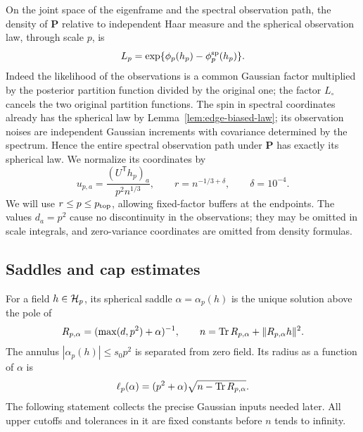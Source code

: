 On the joint space of the eigenframe and the spectral observation path,
the density of $\mathbf P$ relative to independent Haar measure and the
spherical observation law, through scale $p$, is
\begin{equation}\label{eq:source-4}
 L_p=\exp\{\phi_p(h_p)-\phi_p^{\rm sp}(h_p)\}.
\end{equation}
Indeed the likelihood of the observations is a common Gaussian factor
multiplied by the posterior partition function divided by the original one;
the factor $L_\circ$ cancels the two original partition functions.
The spin in spectral coordinates already has the spherical law by
Lemma~\ref{lem:edge-biased-law}; its observation noises are independent
Gaussian increments with covariance determined by the spectrum.  Hence the
entire spectral observation path under $\mathbf P$ has exactly its
spherical law.  We normalize its coordinates by
\[
 u_{p,a}=\frac{(U^{\mathsf T}h_p)_a}{p^2n^{1/3}},
 \qquad r=n^{-1/3+\delta},\qquad \delta=10^{-4}.
\]
We will use $r\le p\le p_{\rm top}$, allowing fixed-factor buffers at the
endpoints.  The values $d_a=p^2$ cause no discontinuity in the observations;
they may be omitted in scale integrals, and zero-variance coordinates are
omitted from density formulas.

\subsection{Saddles and cap estimates}

For a field $h\in\mathcal H_p$, its spherical saddle $\alpha=\alpha_p(h)$ is
the unique solution above the pole of
\begin{equation}\label{eq:source-5}
 R_{p,\alpha}=(\max(d,p^2)+\alpha)^{-1},\qquad
 n=\operatorname{Tr} R_{p,\alpha}+\|R_{p,\alpha}h\|^2.
\end{equation}
The annulus $|\alpha_p(h)|\le s_0p^2$ is separated from zero field.  Its
radius as a function of $\alpha$ is
\[
 \ell_p(\alpha)=(p^2+\alpha)\sqrt{n-\operatorname{Tr} R_{p,\alpha}}.
\]
The following statement collects the precise Gaussian inputs needed later.
All upper cutoffs and tolerances in it are fixed constants before $n$ tends
to infinity.

